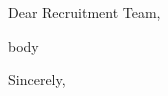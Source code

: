 \documentclass[11pt,letterpaper]{letter}
\begin{document}
\begin{letter}{}

\opening{Dear Recruitment Team,}

body

\closing{Sincerely,}

\end{letter}
\end{document}

